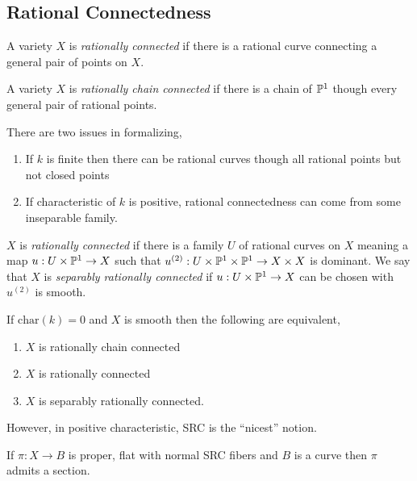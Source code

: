 \documentclass[12pt]{article}
\begin{document}
\subsection{Rational Connectedness}

\begin{defn}
A variety $X$ is \textit{rationally connected} if there is a rational curve connecting a general pair of points on $X$.
\end{defn}

\begin{defn}
A variety $X$ is \textit{rationally chain connected} if there is a chain of $\P^1$ though every general pair of rational points.
\end{defn}

There are two issues in formalizing,
\begin{enumerate}
\item If $k$ is finite then there can be rational curves though all rational points but not closed points
\item If characteristic of $k$ is positive, rational connectedness can come from some inseparable family.
\end{enumerate}


\begin{defn}
$X$ is \textit{rationally connected} if there is a family $U$ of rational curves on $X$ meaning a map $u : U \times \P^1 \to X$ such that $u^{(2)} : U \times \P^1 \times \P^1 \to X \times X$ is dominant. We say that $X$ is \textit{separably rationally connected} if $u : U \times \P^1 \to X$ can be chosen with $u^{(2)}$ is smooth.
\end{defn}

\begin{rmk}
If $\mathrm{char}(k) = 0$ and $X$ is smooth then the following are equivalent,
\begin{enumerate}
\item $X$ is rationally chain connected
\item $X$ is rationally connected
\item $X$ is separably rationally connected.
\end{enumerate}
\end{rmk}

\begin{rmk}
However, in positive characteristic, SRC is the ``nicest'' notion.
\end{rmk}

\begin{thm}
If $\pi : X \to B$ is proper, flat with normal SRC fibers and $B$ is a curve then $\pi$ admits a section.
\end{thm}
\end{document}
